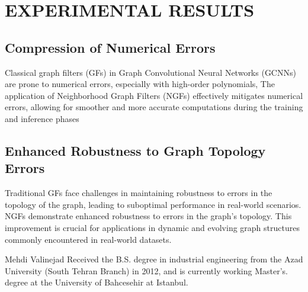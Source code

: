 \documentclass[journal]{IEEEtran}
\begin{document}

\section{EXPERIMENTAL RESULTS}

\subsection*{Compression of Numerical Errors}

Classical graph filters (GFs) in Graph Convolutional Neural Networks (GCNNs) are prone to numerical errors, especially with high-order polynomials,
The application of Neighborhood Graph Filters (NGFs) effectively mitigates numerical errors, allowing for smoother and more accurate computations during the training and inference phases

\subsection*{Enhanced Robustness to Graph Topology Errors}

Traditional GFs face challenges in maintaining robustness to errors in the topology of the graph, leading to suboptimal performance in real-world scenarios.
NGFs demonstrate enhanced robustness to errors in the graph's topology. This improvement is crucial for applications in dynamic and evolving graph structures commonly encountered in real-world datasets.

\ifCLASSOPTIONcaptionsoff
  \newpage
\fi






\begin{IEEEbiographynophoto}{Mehdi Valinejad}
Received the B.S. degree in industrial engineering from the Azad University (South Tehran Branch) in 2012, and is currently working Master's. degree at the University of Bahcesehir at Istanbul.
\end{IEEEbiographynophoto}
\end{document}

